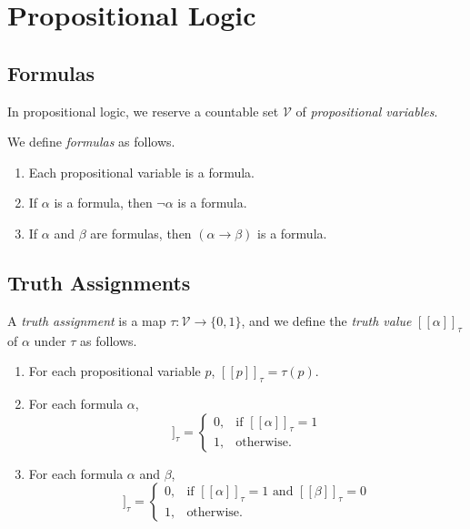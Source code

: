 \chapter{Propositional Logic}
\section{Formulas}
In propositional logic, we reserve a countable set $\mathcal{V}$ of
\emph{propositional variables}.

\begin{definition}
  We define \emph{formulas} as follows.
  \begin{enumerate}[1.]
    \item Each propositional variable is a formula.
    \item If $\alpha$ is a formula, then $\neg\alpha$ is a formula.
    \item If $\alpha$ and $\beta$ are formulas, then $(\alpha \to \beta)$
    is a formula.
  \end{enumerate}
\end{definition}

\section{Truth Assignments}
\begin{definition}
  A \emph{truth assignment} is a map $\tau: \mathcal{V} \to \{0, 1\}$, and we
  define the \emph{truth value} $[\![\alpha]\!]_\tau$ of $\alpha$ under $\tau$
  as follows.
  \begin{enumerate}[1.]
    \item For each propositional variable $p$, $[\![p]\!]_\tau = \tau(p)$.
    \item For each formula $\alpha$,
    \begin{equation*}
      [\![\neg\alpha]\!]_\tau =
    \begin{cases}
      0, & \text{if $[\![\alpha]\!]_\tau = 1$} \\
      1, & \text{otherwise.}
    \end{cases}
    \end{equation*}
    \item For each formula $\alpha$ and $\beta$,
    \begin{equation*}
      [\![(\alpha \to \beta)]\!]_\tau =
    \begin{cases}
      0, & \text{if $[\![\alpha]\!]_\tau = 1$ and $[\![\beta]\!]_\tau = 0$} \\
      1, & \text{otherwise.}
    \end{cases}
    \end{equation*}
  \end{enumerate}
\end{definition}


